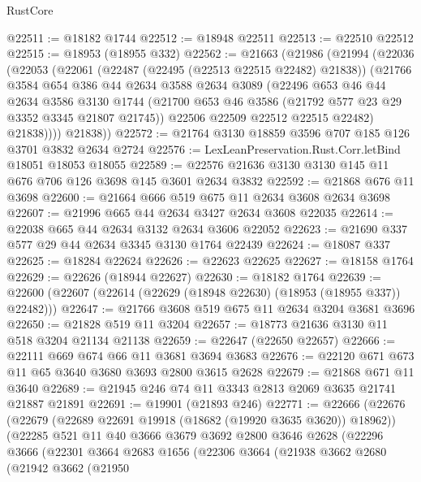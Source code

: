 \begin{lexlean}{RustCore}
\begin{coremodule}
@22511 := @18182 @1744
@22512 := @18948 @22511
@22513 := @22510 @22512
@22515 := @18953 (@18955 @332)
@22562 := @21663
    (@21986
      (@21994
        (@22036
          (@22053
            (@22061
              (@22487 (@22495 (@22513 @22515 @22482) @21838))
              (@21766
                @3584
                @654
                @386
                @44
                @2634
                @3588
                @2634
                @3089
                (@22496
                  @653
                  @46
                  @44
                  @2634
                  @3586
                  @3130
                  @1744
                  (@21700 @653 @46 @3586 (@21792 @577 @23 @29 @3352 @3345 @21807 @21745))
                  @22506
                  @22509
                  @22512
                  @22515
                  @22482)
                @21838))))
        @21838))
@22572 := @21764 @3130 @18859 @3596 @707 @185 @126 @3701 @3832 @2634 @2724
@22576 := LexLeanPreservation.Rust.Corr.letBind @18051 @18053 @18055
@22589 := @22576 @21636 @3130 @3130 @145 @11 @676 @706 @126 @3698 @145 @3601 @2634 @3832
@22592 := @21868 @676 @11 @3698
@22600 := @21664 @666 @519 @675 @11 @2634 @3608 @2634 @3698
@22607 := @21996 @665 @44 @2634 @3427 @2634 @3608 @22035
@22614 := @22038 @665 @44 @2634 @3132 @2634 @3606 @22052
@22623 := @21690 @337 @577 @29 @44 @2634 @3345 @3130 @1764 @22439
@22624 := @18087 @337
@22625 := @18284 @22624
@22626 := @22623 @22625
@22627 := @18158 @1764
@22629 := @22626 (@18944 @22627)
@22630 := @18182 @1764
@22639 := @22600 (@22607 (@22614 (@22629 (@18948 @22630) (@18953 (@18955 @337)) @22482)))
@22647 := @21766 @3608 @519 @675 @11 @2634 @3204 @3681 @3696
@22650 := @21828 @519 @11 @3204
@22657 := @18773 @21636 @3130 @11 @518 @3204 @21134 @21138
@22659 := @22647 (@22650 @22657)
@22666 := @22111 @669 @674 @66 @11 @3681 @3694 @3683
@22676 := @22120 @671 @673 @11 @65 @3640 @3680 @3693 @2800 @3615 @2628
@22679 := @21868 @671 @11 @3640
@22689 := @21945 @246 @74 @11 @3343 @2813 @2069 @3635 @21741 @21887 @21891
@22691 := @19901 (@21893 @246)
@22771 := @22666
    (@22676
      (@22679 (@22689 @22691 @19918 (@18682 (@19920 @3635 @3620)) @18962))
      (@22285
        @521
        @11
        @40
        @3666
        @3679
        @3692
        @2800
        @3646
        @2628
        (@22296
          @3666
          (@22301
            @3664
            @2683
            @1656
            (@22306
              @3664
              (@21938
                @3662
                @2680
                (@21942
                  @3662
                  (@21950

\end{coremodule}
\end{lexlean}
